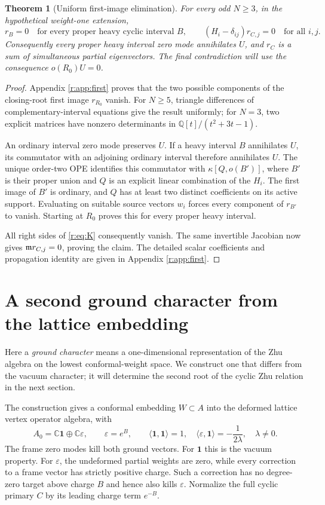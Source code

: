 \documentclass[11pt,a4paper]{article}
\numberwithin{equation}{section}
\newtheorem{theorem}{Theorem}[section]
\theoremstyle{definition}\newtheorem{definition}[theorem]{Definition}
\theoremstyle{remark}\newtheorem{remark}[theorem]{Remark}
\begin{document}
\begin{theorem}[Uniform first-image elimination]\label{r:thm:first}
For every odd \(N\ge3\), in the hypothetical weight-one extension,
\[
 r_B=0\quad\text{for every proper heavy cyclic interval }B,
 \qquad
 (H_i-\delta_{ij})r_{C,j}=0\quad\text{for all }i,j.
\]
Consequently every proper heavy interval zero mode annihilates
\(U\), and \(r_C\) is a sum of simultaneous partial eigenvectors.
The final contradiction will use the consequence \(o(R_0)U=0\).
\end{theorem}

\begin{proof}
Appendix \ref{r:app:first} proves that the two possible components of
the closing-root first image \(r_{R_0}\) vanish. For \(N\ge5\),
triangle differences of complementary-interval equations give
the result uniformly; for \(N=3\), two explicit matrices have
nonzero determinants in \(\mathbb Q[t]/(t^2+3t-1)\).

An ordinary interval zero mode preserves \(U\). If a heavy interval
\(B\) annihilates \(U\), its commutator with an adjoining ordinary
interval therefore annihilates \(U\). The unique order-two OPE
identifies this commutator with
\(\kappa[Q,o(B')]\), where \(B'\) is their proper union and \(Q\)
is an explicit linear combination of the \(H_i\). The first image
of \(B'\) is ordinary, and \(Q\) has at least two distinct
coefficients on its active support. Evaluating on suitable source
vectors \(w_i\) forces every component of \(r_{B'}\) to vanish.
Starting at \(R_0\) proves this for every proper heavy interval.

All right sides of \eqref{r:eq:K} consequently vanish. The same
invertible Jacobian now gives \(\mathfrak m r_{C,j}=0\), proving the claim.
The detailed scalar coefficients and propagation identity are
given in Appendix \ref{r:app:first}.
\end{proof}

\section{A second ground character from the lattice embedding}
\label{neutral:sec:second-ground-character}

Here a \emph{ground character} means a one-dimensional representation
of the Zhu algebra on the lowest conformal-weight space. We construct
one that differs from the vacuum character; it will determine the
second root of the cyclic Zhu relation in the next section.

The construction gives a conformal embedding $W\subset A$ into the
deformed lattice vertex operator algebra, with
\[
 A_0=\mathbb C\mathbf1\oplus\mathbb C\varepsilon,
 \qquad \varepsilon=e^B,\qquad
 \langle\mathbf1,\mathbf1\rangle=1,
 \quad\langle\varepsilon,\mathbf1\rangle=-\frac1{2\lambda},
 \quad\lambda\ne0.
\]
The frame zero modes kill both ground vectors.  For $\mathbf1$ this is
the vacuum property.  For $\varepsilon$, the undeformed partial
weights are zero, while every correction to a frame vector has
strictly positive charge.  Such a correction has no degree-zero
target above charge $B$ and hence also kills $\varepsilon$.
Normalize the full cyclic primary $C$ by its leading charge term
$e^{-B}$.
\end{document}
